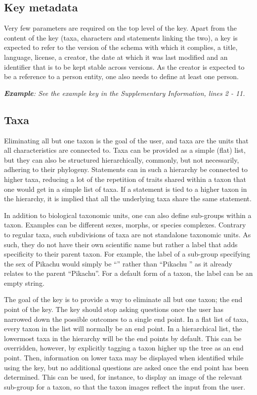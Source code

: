 \documentclass[10pt,letterpaper]{article}
\begin{document}
\subsection*{
Key metadata
}
Very few parameters are required on the top level of the key. Apart from the content of the key (taxa, characters and statements linking the two), a key is expected to refer to the version of the schema with which it complies, a title, language, license, a creator, the date at which it was last modified and an identifier that is to be kept stable across versions. As the creator is expected to be a reference to a person entity, one also needs to define at least one person.

\textit{\textbf{Example}: See the example key in the Supplementary Information, lines 2 - 11.}

\subsection*{
Taxa
}
Eliminating all but one taxon is the goal of the user, and taxa are the units that all characteristics are connected to. Taxa can be provided as a simple (flat) list, but they can also be structured hierarchically, commonly, but not necessarily, adhering to their phylogeny. Statements can in such a hierarchy be connected to higher taxa, reducing a lot of the repetition of traits shared within a taxon that one would get in a simple list of taxa. If a statement is tied to a higher taxon in the hierarchy, it is implied that all the underlying taxa share the same statement.

In addition to biological taxonomic units, one can also define sub-groups within a taxon. Examples can be different sexes, morphs, or species complexes. Contrary to regular taxa, such subdivisions of taxa are not standalone taxonomic units. As such, they do not have their own scientific name but rather a label that adds specificity to their parent taxon. For example, the label of a sub-group specifying the sex of Pikachu would simply be ``\Female'' rather than ``Pikachu \Female'' as it already relates to the parent ``Pikachu''. For a default form of a taxon, the label can be an empty string.

The goal of the key is to provide a way to eliminate all but one taxon; the end point of the key.  The key should stop asking questions once the user has narrowed down the possible outcomes to a single end point. In a flat list of taxa, every taxon in the list will normally be an end point. In a hierarchical list, the lowermost taxa in the hierarchy will be the end points by default. This can be overridden, however, by explicitly tagging a taxon higher up the tree as an end point. Then, information on lower taxa may be displayed when identified while using the key, but no additional questions are asked once the end point has been determined. This can be used, for instance, to display an image of the relevant sub-group for a taxon, so that the taxon images reflect the input from the user.
\end{document}

